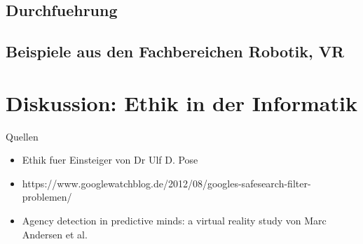 \documentclass[10pt]{beamer}
\begin{document}
\subsection{Durchfuehrung}

\subsection{Beispiele aus den Fachbereichen Robotik, VR}


\section{Diskussion: Ethik in der Informatik}




\begin{frame}{Quellen}
	\begin{itemize}
		\item Ethik fuer Einsteiger von Dr Ulf D. Pose
		\item https://www.googlewatchblog.de/2012/08/googles-safesearch-filter-problemen/
		\item Agency detection in predictive minds: a virtual reality study von Marc Andersen et al.
	\end{itemize}
	
\end{frame}
\end{document}
